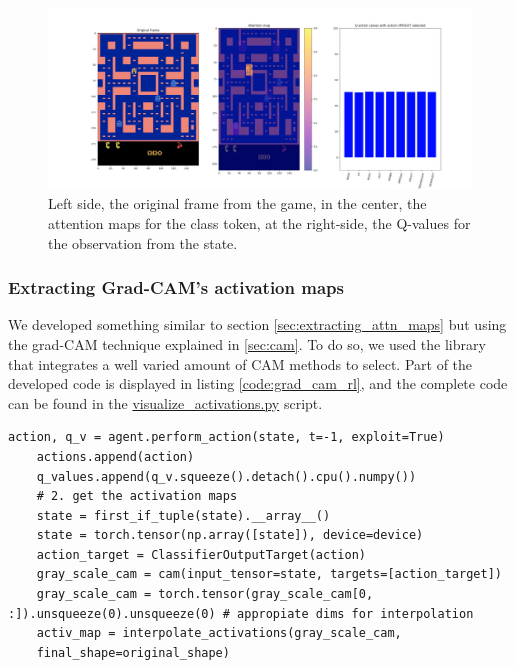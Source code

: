 \begin{figure} [!h]
	\centering
	\includegraphics[width=\linewidth]{figures/attn_visualization_frame}
	\caption{Left side, the original frame from the game, in the center, the attention maps for the class token, at the right-side, the Q-values for the observation from the state.}
	\label{fig:attnvisualizationframe}
\end{figure}


\subsubsection{Extracting Grad-CAM's activation maps}
\label{sec:grad_cam_act_maps}
We developed something similar to section \ref{sec:extracting_attn_maps} but using the grad-CAM technique explained in \ref{sec:cam}. To do so, we used the  library \cite{jacobgilpytorchcam} that integrates a well varied amount of CAM methods to select. Part of the developed code is displayed in listing \ref{code:grad_cam_rl}, and the complete code can be found in the \href{https://github.com/Javimh18/DL_TFM/blob/main/src/visualize_activations.py}{visualize\_activations.py} script.

\begin{lstlisting}[caption={Activation maps using Grad-CAM}, label={code:grad_cam_rl}]
	action, q_v = agent.perform_action(state, t=-1, exploit=True)
	actions.append(action)
	q_values.append(q_v.squeeze().detach().cpu().numpy())
	# 2. get the activation maps
	state = first_if_tuple(state).__array__()
	state = torch.tensor(np.array([state]), device=device)
	action_target = ClassifierOutputTarget(action)
	gray_scale_cam = cam(input_tensor=state, targets=[action_target])
	gray_scale_cam = torch.tensor(gray_scale_cam[0, :]).unsqueeze(0).unsqueeze(0) # appropiate dims for interpolation
	activ_map = interpolate_activations(gray_scale_cam,
	final_shape=original_shape)
\end{lstlisting}

